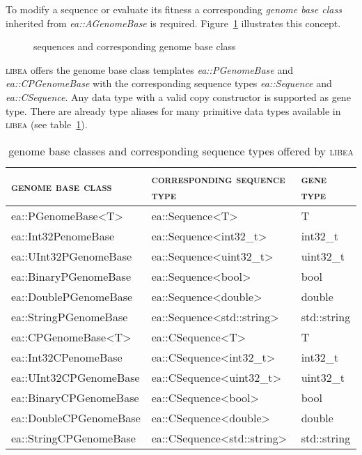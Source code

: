 \documentclass[a4paper]{article}
\begin{document}
To modify a sequence or evaluate its fitness a corresponding \textit{genome base class} inherited from \textit{ea::AGenomeBase} is required. Figure~\ref{fig:overview} illustrates this concept.

\begin{figure}[h]
\caption{sequences and corresponding genome base class}
\label{fig:overview}
{

}
\end{figure}

\textsc{libea} offers the genome base class templates \textit{ea::PGenomeBase} and \textit{ea::CPGenomeBase} with the corresponding sequence types \textit{ea::Sequence} and \textit{ea::CSequence}. Any data type with a valid copy constructor is supported as gene type. There are already type aliases for many primitive data types available in \textsc{libea} (see table~\ref{tab:genome-base-classes-and-sequences}).

\begin{table}[h]
\begin{tabular}{|l|l|l|}
\hline
\textsc{genome base class} & \textsc{corresponding sequence type} & \textsc{gene type} \\
\hline
ea::PGenomeBase\textless T\textgreater & ea::Sequence\textless T\textgreater & T \\
ea::Int32PenomeBase & ea::Sequence\textless int32\_t\textgreater & int32\_t \\
ea::UInt32PGenomeBase & ea::Sequence\textless uint32\_t\textgreater & uint32\_t \\
ea::BinaryPGenomeBase & ea::Sequence\textless bool\textgreater & bool \\
ea::DoublePGenomeBase & ea::Sequence\textless double\textgreater & double \\
ea::StringPGenomeBase & ea::Sequence\textless std::string\textgreater & std::string \\
\hline
ea::CPGenomeBase\textless T\textgreater & ea::CSequence\textless T\textgreater & T \\
ea::Int32CPenomeBase & ea::CSequence\textless int32\_t\textgreater & int32\_t \\
ea::UInt32CPGenomeBase & ea::CSequence\textless uint32\_t\textgreater & uint32\_t \\
ea::BinaryCPGenomeBase & ea::CSequence\textless bool\textgreater & bool \\
ea::DoubleCPGenomeBase & ea::CSequence\textless double\textgreater & double \\
ea::StringCPGenomeBase & ea::CSequence\textless std::string\textgreater & std::string \\
\hline
\end{tabular}
\caption{genome base classes and corresponding sequence types offered by \textsc{libea}}
\label{tab:genome-base-classes-and-sequences}
\end{table}
\end{document}
